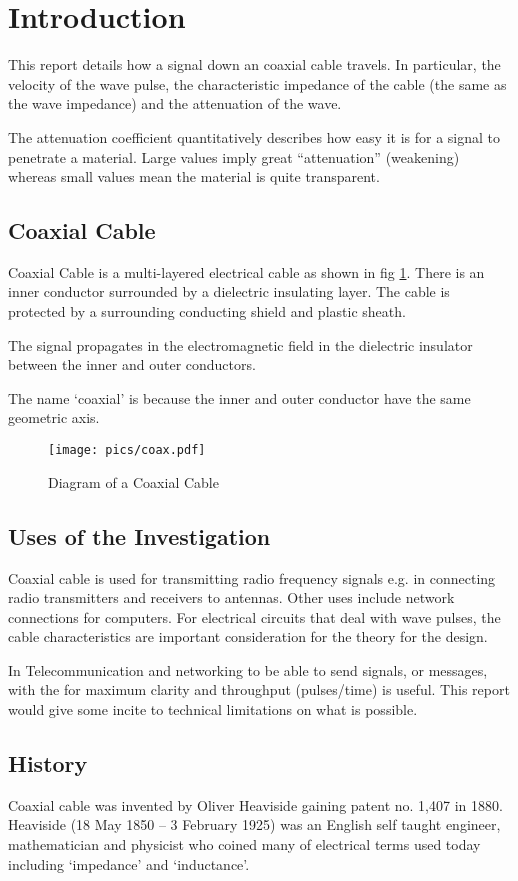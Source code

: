 \section{Introduction}
This report details how a signal down an coaxial cable travels. In particular,
the velocity of the wave pulse, the characteristic impedance of the cable (the same as
the wave impedance) and the attenuation of the wave.

The attenuation coefficient quantitatively describes how easy it is for a signal
to penetrate a material. Large values imply great ``attenuation'' (weakening) whereas
small values mean the material is quite transparent.

\subsection{Coaxial Cable}
Coaxial Cable is a multi-layered electrical cable as shown in fig \ref{fig:coax}.
There is an inner conductor surrounded by a dielectric insulating layer.
The cable is protected by a surrounding conducting shield and plastic sheath.

The signal propagates in the electromagnetic field in the dielectric insulator
between the inner and outer conductors.

The name `coaxial' is because the inner and outer conductor have the same geometric axis.

\begin{figure}[htbp]
\centering
\texttt{[image: pics/coax.pdf]}
\caption{Diagram of a Coaxial Cable \label{fig:coax}}
\end{figure}

\subsection{Uses of the Investigation}
Coaxial cable is used for transmitting radio frequency signals e.g. in connecting radio transmitters and receivers to antennas.
Other uses include network connections for computers. For electrical circuits that deal with wave pulses, the cable characteristics are
important consideration for the theory for the design.

In Telecommunication and networking to be able to send signals, or messages, with the
for maximum clarity and throughput (pulses/time) is useful.
This report would give some incite to technical limitations on what is possible.

\subsection{History}
Coaxial cable was invented by Oliver Heaviside \cite{OliverHeav} gaining patent no. 1,407 in 1880.
Heaviside (18 May 1850 -- 3 February 1925) was an English self taught engineer,
mathematician and physicist who coined many of electrical terms used today
including `impedance' and `inductance'\cite{oliver}.



